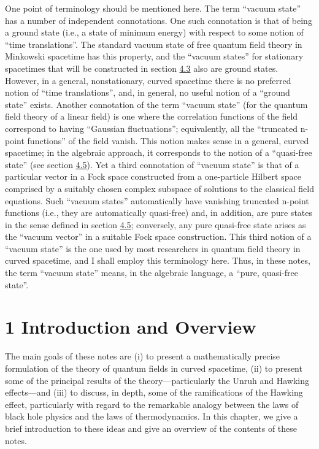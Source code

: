 \documentclass[11pt,a4paper]{article}
\begin{document}
One point of terminology should be mentioned here. The term ``vacuum state'' has a number of independent connotations. One such connotation is that of being a ground state (i.e., a state of minimum energy) with respect to some notion of ``time translations''. The standard vacuum state of free quantum field theory in Minkowski spacetime has this property, and the ``vacuum states'' for stationary spacetimes that will be constructed in section \hyperlink{sec:4.3}{4.3} also are ground states. However, in a general, nonstationary, curved spacetime there is no preferred notion of ``time translations'', and, in general, no useful notion of a ``ground state'' exists. Another connotation of the term ``vacuum state'' (for the quantum field theory of a linear field) is one where the correlation functions of the field correspond to having ``Gaussian fluctuations''; equivalently, all the ``truncated n-point functions'' of the field vanish. This notion makes sense in a general, curved spacetime; in the algebraic approach, it corresponds to the notion of a ``quasi-free state'' (see section \hyperlink{sec:4.5}{4.5}). Yet a third connotation of ``vacuum state'' is that of a particular vector in a Fock \hypertarget{source-12}{} space constructed from a one-particle Hilbert space comprised by a suitably chosen complex subspace of solutions to the classical field equations. Such ``vacuum states'' automatically have vanishing truncated n-point functions (i.e., they are automatically quasi-free) and, in addition, are pure states in the sense defined in section \hyperlink{sec:4.5}{4.5}; conversely, any pure quasi-free state arises as the ``vacuum vector'' in a suitable Fock space construction. This third notion of a ``vacuum state'' is the one used by most researchers in quantum field theory in curved spacetime, and I shall employ this terminology here. Thus, in these notes, the term ``vacuum state'' means, in the algebraic language, a ``pure, quasi-free state''.

\clearpage
\hypertarget{source-14}{}
\section*{1 Introduction and Overview}\hypertarget{sec:1}{}

The main goals of these notes are (i) to present a mathematically precise formulation of the theory of quantum fields in curved spacetime, (ii) to present some of the principal results of the theory---particularly the Unruh and Hawking effects---and (iii) to discuss, in depth, some of the ramifications of the Hawking effect, particularly with regard to the remarkable analogy between the laws of black hole physics and the laws of thermodynamics. In this chapter, we give a brief introduction to these ideas and give an overview of the contents of these notes.
\end{document}
